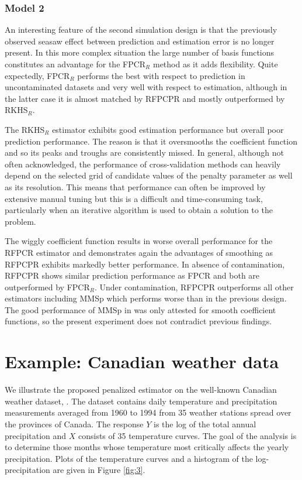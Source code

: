 \documentclass[11pt]{article}
\begin{document}
\subsubsection{Model 2}

An interesting feature of the second simulation design is that the previously observed seasaw effect between prediction and estimation error is no longer present. In this more complex situation the large number of basis functions constitutes an advantage for the FPCR$_R$ method as it adds flexibility. Quite expectedly, FPCR$_R$ performs the best with respect to prediction in uncontaminated datasets and very well with respect to estimation, although in the latter case it is almost matched by RFPCPR and mostly outperformed by RKHS$_R$.

The RKHS$_R$ estimator exhibits good estimation performance but overall poor prediction performance. The reason is that it oversmooths the coefficient function and so its peaks and troughs are consistently missed. In general, although not often acknowledged, the performance of cross-validation methods can heavily depend on the selected grid of candidate values of the penalty parameter as well as its resolution. This means that performance can often be improved by extensive manual tuning but this is a difficult and time-consuming task, particularly when an iterative algorithm is used to obtain a solution to the problem. 

The wiggly coefficient function results in worse overall performance for the RFPCR estimator and demonstrates again the advantages of smoothing as RFPCPR exhibits markedly better performance. In absence of contamination, RFPCPR shows similar prediction performance as FPCR and both are outperformed by FPCR$_R$. Under contamination, RFPCPR outperforms all other estimators including MMSp which performs worse than in the previous design. The good performance of MMSp in \citep{maronna2013robust} was only attested for smooth coefficient functions, so the present experiment does not contradict previous findings.

\section{Example: Canadian weather data}

We illustrate the proposed penalized estimator on the well-known Canadian weather dataset, \citep{ramsay2006functional}. The dataset contains daily temperature and precipitation measurements averaged from 1960 to 1994 from 35 weather stations spread over the provinces of Canada. The response $Y$ is the log of the total annual precipitation and $X$ consists of 35 temperature curves. The goal of the analysis is to determine those months whose temperature most critically affects the yearly precipitation. Plots of the temperature curves and a histogram of the log-precipitation are given in Figure \ref{fig:3}.
\end{document}
